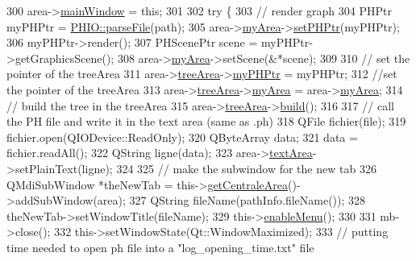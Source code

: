 \begin{DoxyCode}
300             area->\hyperlink{classArea_a78dfb0c8316dbe90af1e5c905db5b6d1}{mainWindow} = \textcolor{keyword}{this};
301 
302             \textcolor{keywordflow}{try} \{
303                 \textcolor{comment}{// render graph}
304                 PHPtr myPHPtr = \hyperlink{classPHIO_a392414cadc400154232f5488fba80600}{PHIO::parseFile}(path);
305                 area->\hyperlink{classArea_a3c00ea9bb14425efbee3fcf80410c4cf}{myArea}->\hyperlink{classMyArea_a087c389370070a348af025aaee620fc8}{setPHPtr}(myPHPtr);
306                 myPHPtr->render();
307                 PHScenePtr scene = myPHPtr->getGraphicsScene();
308                 area->\hyperlink{classArea_a3c00ea9bb14425efbee3fcf80410c4cf}{myArea}->setScene(&*scene);
309 
310                 \textcolor{comment}{// set the pointer of the treeArea}
311                 area->\hyperlink{classArea_a950b6ed9a4e754ef1a7879b727ea8749}{treeArea}->\hyperlink{classTreeArea_a290d659da16085f21c04f81fcd16891c}{myPHPtr} = myPHPtr;
312                 \textcolor{comment}{//set the pointer of the treeArea}
313                 area->\hyperlink{classArea_a950b6ed9a4e754ef1a7879b727ea8749}{treeArea}->\hyperlink{classTreeArea_a1bd090dc9ab10415e8f897b6300bc555}{myArea} = area->\hyperlink{classArea_a3c00ea9bb14425efbee3fcf80410c4cf}{myArea};
314                 \textcolor{comment}{// build the tree in the treeArea}
315                 area->\hyperlink{classArea_a950b6ed9a4e754ef1a7879b727ea8749}{treeArea}->\hyperlink{classTreeArea_a8fd7c22b1c8c4e8cb9503731d66c5d47}{build}();
316 
317                 \textcolor{comment}{// call the PH file and write it in the text area (same as .ph)}
318                 QFile fichier(file);
319                 fichier.open(QIODevice::ReadOnly);
320                 QByteArray data;
321                 data = fichier.readAll();
322                 QString ligne(data);
323                 area->\hyperlink{classArea_a001e5b841c3e4126a128de13171f05d3}{textArea}->setPlainText(ligne);
324 
325                 \textcolor{comment}{// make the subwindow for the new tab}
326                 QMdiSubWindow *theNewTab = this->\hyperlink{classMainWindow_a7ef4a7c09626b415053b30bc412a3b1f}{getCentraleArea}()->addSubWindow(area);
327                 QString fileName(pathInfo.fileName());
328                 theNewTab->setWindowTitle(fileName);
329                 this->\hyperlink{classMainWindow_ac4c3ec77ba5666ff9ef670b4b02c6838}{enableMenu}();
330 
331                 mb->close();
332                 this->setWindowState(Qt::WindowMaximized);
333                 \textcolor{comment}{// putting time needed to open ph file into a "log\_opening\_time.txt" file}

\end{DoxyCode}
